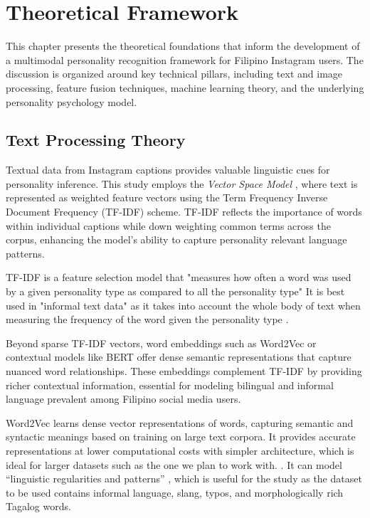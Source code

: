 %
%
%                 

\chapter{Theoretical Framework}
\label{sec:theoframework}

This chapter presents the theoretical foundations that inform the development of a multimodal personality recognition framework for Filipino Instagram users. The discussion is organized around key technical pillars, including text and image processing, feature fusion techniques, machine learning theory, and the underlying personality psychology model.

\section{Text Processing Theory}

Textual data from Instagram captions provides valuable linguistic cues for personality inference. This study employs the \textit{Vector Space Model} \citep{salton1975}, where text is represented as weighted feature vectors using the Term Frequency Inverse Document Frequency (TF-IDF) scheme. TF-IDF reflects the importance of words within individual captions while down weighting common terms across the corpus, enhancing the model's ability to capture personality relevant language patterns.


TF-IDF is a feature selection model that "measures how often a word was used by a given personality type as compared to all the personality type" It is best used in "informal text data" as it takes into account the whole body of text when measuring the frequency of the word given the personality type \citep{Pradhan_Bhansali_Chandnani_Pangaonkar_2020}.

Beyond sparse TF-IDF vectors, word embeddings such as Word2Vec or contextual models like BERT offer dense semantic representations that capture nuanced word relationships. These embeddings complement TF-IDF by providing richer contextual information, essential for modeling bilingual and informal language prevalent among Filipino social media users.

Word2Vec learns dense vector representations of words, capturing semantic and syntactic meanings based on training on large text corpora. It provides accurate representations at lower computational costs with simpler architecture, which is ideal for larger datasets such as the one we plan to work with.  \citep{Ma_Zhang_2015}. It can model “linguistic regularities and patterns” \citep{Mikolov_Sutskever_Chen_Corrado_Dean_2013}, which is useful for the study as the dataset to be used contains informal language, slang, typos, and morphologically rich Tagalog words. 


